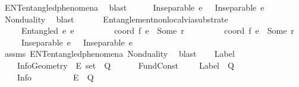 \begin{isabellebody}
\ ENT{}{\isacharunderscore}{\kern0pt}entangled{\isacharunderscore}{\kern0pt}phenomena\ \isamarkupfalse%
\ blast\isanewline
\ \ \ \ \isamarkupfalse%
\ {\isachardoublequoteopen}Inseparable\ e{}\ {\isasymOmega}\ {\isasymand}\ Inseparable\ e{}\ {\isasymOmega}{\isachardoublequoteclose}\ \isamarkupfalse%
\ Nonduality\ \isamarkupfalse%
\ blast\isanewline
\ \ \isamarkupfalse%
%
\endisatagproof
{\isafoldproof}%
%
\isadelimproof
\isanewline
%
\endisadelimproof
\isanewline
\ \ \isamarkupfalse%
\ Entanglement{\isacharunderscore}{\kern0pt}nonlocal{\isacharunderscore}{\kern0pt}via{\isacharunderscore}{\kern0pt}substrate{\isacharcolon}{\kern0pt}\isanewline
\ \ \ \ \ {\isachardoublequoteopen}Entangled\ e{}\ e{}{\isachardoublequoteclose}\isanewline
\ \ \ \ \ \ \ \ \ {\isachardoublequoteopen}coord\ f\ e{}\ {\isacharequal}{\kern0pt}\ Some\ r{}{\isachardoublequoteclose}\isanewline
\ \ \ \ \ \ \ \ \ {\isachardoublequoteopen}coord\ f\ e{}\ {\isacharequal}{\kern0pt}\ Some\ r{}{\isachardoublequoteclose}\isanewline
\ \ \ \ \ {\isachardoublequoteopen}Inseparable\ e{}\ {\isasymOmega}\ {\isasymand}\ Inseparable\ e{}\ {\isasymOmega}{\isachardoublequoteclose}\isanewline
%
\isadelimproof
\ \ \ \ %
\endisadelimproof
%
\isatagproof
{}\isamarkupfalse%
\ assms\ ENT{}{\isacharunderscore}{\kern0pt}entangled{\isacharunderscore}{\kern0pt}phenomena\ Nonduality\ \isamarkupfalse%
\ blast%
\endisatagproof
{\isafoldproof}%
%
\isadelimproof
%
\endisadelimproof
%
\isadelimdocument
%
\endisadelimdocument
%
\isatagdocument
%
\isamarkuptrue%
%
\endisatagdocument
{\isafolddocument}%
%
\isadelimdocument
%
\endisadelimdocument
\ \ \isamarkupfalse%
\ Label\ \ \isanewline
\isanewline
\ \ \isamarkupfalse%
\isanewline
\ \ \ \ InfoGeometry\ {\isacharcolon}{\kern0pt}{\isacharcolon}{\kern0pt}\ {\isachardoublequoteopen}E\ set\ {\isasymRightarrow}\ Q{\isachardoublequoteclose}\ \ \isanewline
\ \ \ \ FundConst\ \ \ \ {\isacharcolon}{\kern0pt}{\isacharcolon}{\kern0pt}\ {\isachardoublequoteopen}Label\ {\isasymRightarrow}\ Q{\isachardoublequoteclose}\ \ \isanewline
\ \ \ \ Info\ \ \ \ \ \ \ \ \ {\isacharcolon}{\kern0pt}{\isacharcolon}{\kern0pt}\ {\isachardoublequoteopen}E\ {\isasymRightarrow}\ Q{\isachardoublequoteclose}\ \ \ \ \ \ \isanewline

\end{isabellebody}

